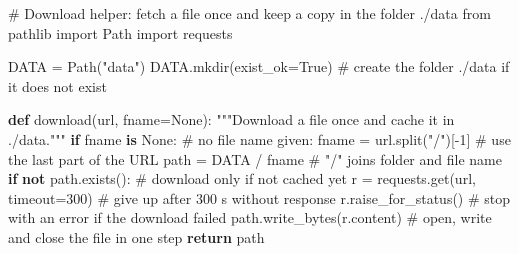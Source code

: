 \documentclass[
  letterpaper,
  DIV=11,
  numbers=noendperiod]{scrreprt}
\newenvironment{Shaded}{\begin{snugshade}}{\end{snugshade}}
\newcommand{\CommentTok}[1]{\textcolor[rgb]{0.37,0.37,0.37}{#1}}
\newcommand{\ControlFlowTok}[1]{\textcolor[rgb]{0.00,0.23,0.31}{\textbf{#1}}}
\newcommand{\DecValTok}[1]{\textcolor[rgb]{0.68,0.00,0.00}{#1}}
\newcommand{\ImportTok}[1]{\textcolor[rgb]{0.00,0.46,0.62}{#1}}
\newcommand{\KeywordTok}[1]{\textcolor[rgb]{0.00,0.23,0.31}{\textbf{#1}}}
\newcommand{\NormalTok}[1]{\textcolor[rgb]{0.00,0.23,0.31}{#1}}
\newcommand{\OperatorTok}[1]{\textcolor[rgb]{0.37,0.37,0.37}{#1}}
\newcommand{\StringTok}[1]{\textcolor[rgb]{0.13,0.47,0.30}{#1}}
\newcommand{\VariableTok}[1]{\textcolor[rgb]{0.07,0.07,0.07}{#1}}
\begin{document}
\begin{Shaded}
\begin{Highlighting}[]
\CommentTok{\# Download helper: fetch a file once and keep a copy in the folder ./data}
\ImportTok{from}\NormalTok{ pathlib }\ImportTok{import}\NormalTok{ Path}
\ImportTok{import}\NormalTok{ requests}

\NormalTok{DATA }\OperatorTok{=}\NormalTok{ Path(}\StringTok{"data"}\NormalTok{)}
\NormalTok{DATA.mkdir(exist\_ok}\OperatorTok{=}\VariableTok{True}\NormalTok{)                         }\CommentTok{\# create the folder ./data if it does not exist}

\KeywordTok{def}\NormalTok{ download(url, fname}\OperatorTok{=}\VariableTok{None}\NormalTok{):}
    \CommentTok{"""Download a file once and cache it in ./data."""}
    \ControlFlowTok{if}\NormalTok{ fname }\KeywordTok{is} \VariableTok{None}\NormalTok{:                             }\CommentTok{\# no file name given:}
\NormalTok{        fname }\OperatorTok{=}\NormalTok{ url.split(}\StringTok{"/"}\NormalTok{)[}\OperatorTok{{-}}\DecValTok{1}\NormalTok{]                }\CommentTok{\# use the last part of the URL}
\NormalTok{    path }\OperatorTok{=}\NormalTok{ DATA }\OperatorTok{/}\NormalTok{ fname                           }\CommentTok{\# "/" joins folder and file name}
    \ControlFlowTok{if} \KeywordTok{not}\NormalTok{ path.exists():                         }\CommentTok{\# download only if not cached yet}
\NormalTok{        r }\OperatorTok{=}\NormalTok{ requests.get(url, timeout}\OperatorTok{=}\DecValTok{300}\NormalTok{)        }\CommentTok{\# give up after 300 s without response}
\NormalTok{        r.raise\_for\_status()                      }\CommentTok{\# stop with an error if the download failed}
\NormalTok{        path.write\_bytes(r.content)               }\CommentTok{\# open, write and close the file in one step}
    \ControlFlowTok{return}\NormalTok{ path}
\end{Highlighting}
\end{Shaded}
\end{document}

